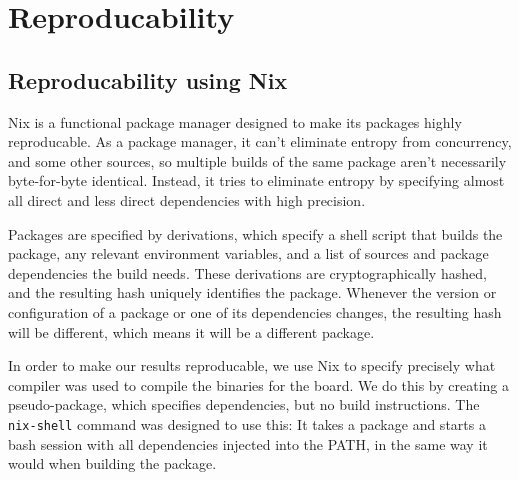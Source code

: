 \section{Reproducability}

\subsection{Reproducability using Nix}

Nix\cite{nix} is a functional package manager designed to make its packages
highly reproducable. As a package manager, it can't eliminate entropy from
concurrency, and some other sources, so multiple builds of the same package
aren't necessarily byte-for-byte identical. Instead, it tries to eliminate
entropy by specifying almost all direct and less direct dependencies with high
precision.

Packages are specified by derivations, which specify a shell script that
builds the package, any relevant environment variables, and a list of
sources and package dependencies the build needs. These derivations are
cryptographically hashed, and the resulting hash uniquely identifies the
package. Whenever the version or configuration of a package or one of
its dependencies changes, the resulting hash will be different, which
means it will be a different package.

In order to make our results reproducable, we use Nix to specify
precisely what compiler was used to compile the binaries for the board.
We do this by creating a pseudo-package, which specifies dependencies,
but no build instructions. The \texttt{nix-shell} command was designed
to use this: It takes a package and starts a bash session with all
dependencies injected into the PATH, in the same way it would when
building the package.
